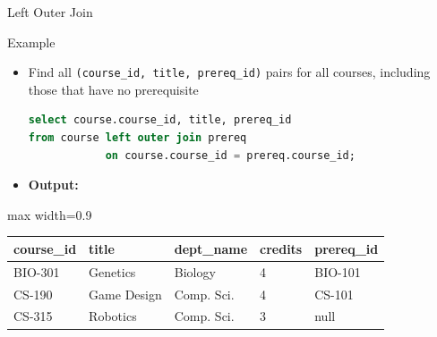 \documentclass[aspectratio=169, xcolor=dvipsnames]{beamer}
\begin{document}
\begin{frame}[fragile]{Left Outer Join}
    \begin{exampleblock}{Example}
        \begin{itemize}[<+->]
            \item Find all \texttt{(course\_id, title, prereq\_id)} pairs for all courses, including those that have no prerequisite
            \begin{lstlisting}[language=SQL]
select course.course_id, title, prereq_id
from course left outer join prereq 
            on course.course_id = prereq.course_id;
            \end{lstlisting}
            \item \textbf{Output:}
        \end{itemize}
    \end{exampleblock}
    \begin{center}
        \begin{adjustbox}{max width=0.9\textwidth}
        \begin{tabular}{|l|l|l|l|l|}
        \hline
        \textbf{course\_id} & \textbf{title} & \textbf{dept\_name} & \textbf{credits} & \textbf{prereq\_id} \\ \hline
        BIO-301 & Genetics & Biology & 4 & BIO-101 \\ \hline
        CS-190 & Game Design & Comp. Sci. & 4 & CS-101 \\ \hline
        CS-315 & Robotics & Comp. Sci. & 3 & null \\ \hline
        \end{tabular}
        \end{adjustbox}
    \end{center}
\end{frame}
\end{document}

